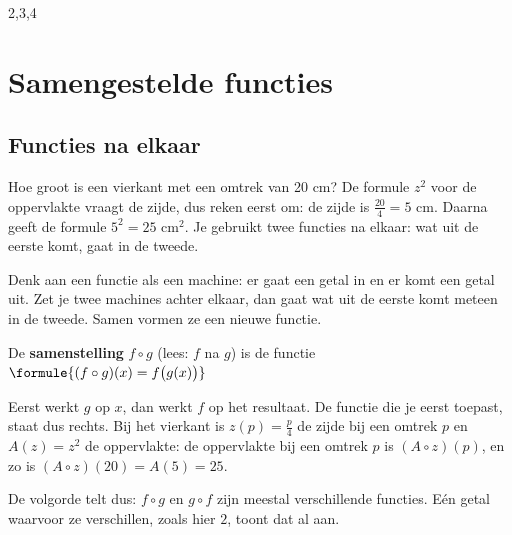 \begin{alleenvoor}{2,3,4}
\section{Samengestelde functies}

\subsection{Functies na elkaar}

Hoe groot is een vierkant met een omtrek van 20 cm? De formule $z^2$ voor de oppervlakte vraagt de zijde, dus reken eerst om: de zijde is $\frac{20}{4} = 5$ cm. Daarna geeft de formule $5^2 = 25$ cm$^2$. Je gebruikt twee functies na elkaar: wat uit de eerste komt, gaat in de tweede.

Denk aan een functie als een machine: er gaat een getal in en er komt een getal uit. Zet je twee machines achter elkaar, dan gaat wat uit de eerste komt meteen in de tweede. Samen vormen ze een nieuwe functie.

\begin{theorie}
De \textbf{\textcolor{accent}{samenstelling}} $f \circ g$ (lees: $f$ na $g$) is de functie \quad $\formule{(f \circ g)(x) = f\bigl(g(x)\bigr)}$
\end{theorie}

Eerst werkt $g$ op $x$, dan werkt $f$ op het resultaat. De functie die je eerst toepast, staat dus rechts. Bij het vierkant is $z(p) = \frac{p}{4}$ de zijde bij een omtrek $p$ en $A(z) = z^2$ de oppervlakte: de oppervlakte bij een omtrek $p$ is $(A \circ z)(p)$, en zo is $(A \circ z)(20) = A(5) = 25$.


De volgorde telt dus: $f \circ g$ en $g \circ f$ zijn meestal verschillende functies. Eén getal waarvoor ze verschillen, zoals hier $2$, toont dat al aan.


\end{alleenvoor}
